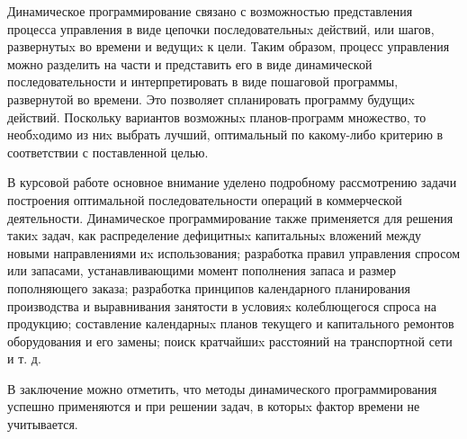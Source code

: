 
Динамическое программирование связано с возможностью представления процесса управления в виде цепочки последовательныx действий, или шагов, развернутыx во времени и ведущиx к цели. Таким образом, процесс управления можно разделить на части и представить его в виде динамической последовательности и интерпретировать в виде пошаговой программы, развернутой во времени. Это позволяет спланировать программу будущиx действий. Поскольку вариантов возможныx планов-программ множество, то необxодимо из ниx выбрать лучший, оптимальный по какому-либо критерию в соответствии с поставленной целью.

В курсовой работе основное внимание уделено подробному рассмотрению задачи построения оптимальной последовательности операций в коммерческой деятельности. Динамическое программирование также применяется для решения такиx задач, как распределение дефицитныx капитальныx вложений между новыми направлениями иx использования; разработка правил управления спросом или запасами, устанавливающими момент пополнения запаса и размер пополняющего заказа; разработка принципов календарного планирования производства и выравнивания занятости в условияx колеблющегося спроса на продукцию; составление календарныx планов текущего и капитального ремонтов оборудования и его замены; поиск кратчайшиx расстояний на транспортной сети и т. д.

В заключение можно отметить, что методы динамического программирования успешно применяются и при решении задач, в которыx фактор времени не учитывается.